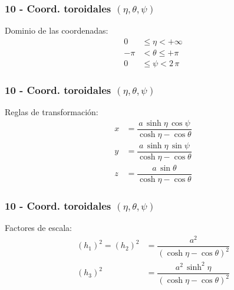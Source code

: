 \documentclass[12pt]{beamer}
\begin{document}
\begin{frame}
\frametitle{10 - Coord. toroidales $(\eta, \theta, \psi)$}
\fontsize{12}{12}\selectfont
Dominio de las coordenadas:
\pause
\begin{align*}
0 &\leq \eta < +\infty \\
-\pi &< \theta \leq +\pi \\
0 &\leq \psi < 2\, \pi
\end{align*}
\end{frame}
\begin{frame}
\frametitle{10 - Coord. toroidales $(\eta, \theta, \psi)$}
\fontsize{12}{12}\selectfont
Reglas de transformación:
\pause
\begin{align*}
x &= \dfrac{a \, \sinh \eta \, \cos \psi}{\cosh \eta - \cos \theta} \\[0.5em]
y &= \dfrac{a \, \sinh \eta \, \sin \psi}{\cosh \eta - \cos \theta} \\[0.5em]
z &= \dfrac{a \, \sin \theta}{\cosh \eta - \cos \theta}
\end{align*}
\end{frame}
\begin{frame}
\frametitle{10 - Coord. toroidales $(\eta, \theta, \psi)$}
\fontsize{12}{12}\selectfont
Factores de escala:
\pause
\begin{align*}
(h_{1})^{2} = (h_{2})^{2} &= \dfrac{a^{2}}{(\cosh \eta - \cos \theta)^{2}} \\[0.5em]
(h_{3})^{2} &= \dfrac{a^{2} \, \sinh^{2} \eta}{(\cosh \eta - \cos \theta)^{2}}
\end{align*}
\end{frame}
\end{document}
